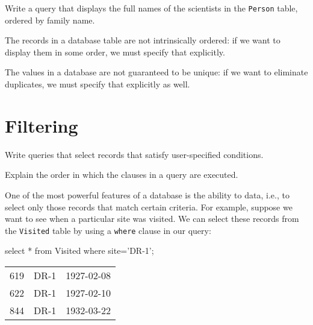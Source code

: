 \documentclass{book}
\begin{document}
\begin{challenge}
  Write a query that displays the full names of the scientists in the
  \texttt{Person} table, ordered by family name.
\end{challenge}

\begin{keypoints}
\begin{swcitemize}
\item
  The records in a database table are not intrinsically ordered: if we
  want to display them in some order, we must specify that explicitly.
\item
  The values in a database are not guaranteed to be unique: if we want
  to eliminate duplicates, we must specify that explicitly as well.
\end{swcitemize}
\end{keypoints}

\section{Filtering}

\begin{objectives}
\begin{swcitemize}
\item
  Write queries that select records that satisfy user-specified
  conditions.
\item
  Explain the order in which the clauses in a query are executed.
\end{swcitemize}
\end{objectives}

One of the most powerful features of a database is the ability to
 data, i.e., to select only those records
that match certain criteria. For example, suppose we want to see when a
particular site was visited. We can select these records from the
\texttt{Visited} table by using a \texttt{where} clause in our query:

\begin{VerbIn}
\end{VerbIn}

\begin{VerbIn}
select * from Visited where site='DR-1';
\end{VerbIn}

\begin{tabular}{lll}
619 & DR-1 & 1927-02-08 \\
622 & DR-1 & 1927-02-10 \\
844 & DR-1 & 1932-03-22 \\
\end{tabular}
\end{document}
